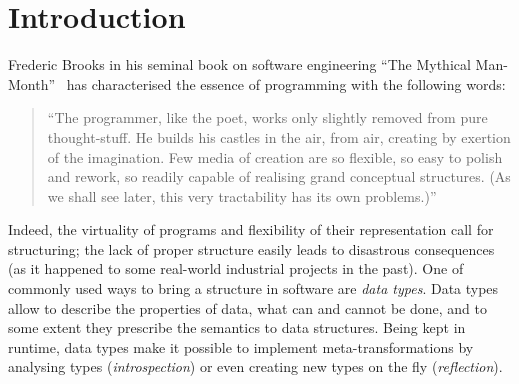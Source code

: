 \section{Introduction}

Frederic Brooks in his seminal book on software engineering ``The Mythical Man-Month''~\cite{MMM} has characterised the essence of programming with the following words:

\blockquote{``The programmer, like the poet, works only slightly removed from pure thought-stuff. He builds his castles in the air, from air, creating by exertion of the imagination. Few media of
creation are so flexible, so easy to polish and rework, so readily capable of realising grand conceptual structures. (As we shall see later, this very tractability has its own problems.)''}

Indeed, the virtuality of programs and flexibility of their representation call for structuring; the lack of proper structure easily leads to disastrous consequences
(as it happened to some real-world industrial projects in the past). One of commonly used ways to bring a
structure in software are \emph{data types}. Data types allow to describe the properties of data, what can and cannot be done, and to some extent they prescribe
the semantics to data structures. Being kept in runtime, data types make it possible to implement meta-transformations by analysing types (\emph{introspection})
or even creating new types on the fly (\emph{reflection}).

